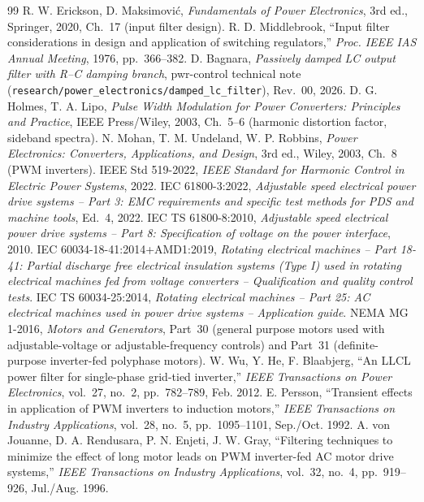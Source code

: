 \documentclass[10pt,a4paper]{scrartcl}
\begin{document}
\begin{thebibliography}{99}
 R. W. Erickson, D. Maksimovi\'c, \emph{Fundamentals of Power Electronics}, 3rd ed., Springer, 2020, Ch.~17 (input filter design).
 R. D. Middlebrook, ``Input filter considerations in design and application of switching regulators,'' \emph{Proc. IEEE IAS Annual Meeting}, 1976, pp.~366--382.
 D. Bagnara, \emph{Passively damped LC output filter with R--C damping branch}, pwr-control technical note (\texttt{research/power\_electronics/damped\_lc\_filter}), Rev.~00, 2026.
 D. G. Holmes, T. A. Lipo, \emph{Pulse Width Modulation for Power Converters: Principles and Practice}, IEEE Press/Wiley, 2003, Ch.~5--6 (harmonic distortion factor, sideband spectra).
 N. Mohan, T. M. Undeland, W. P. Robbins, \emph{Power Electronics: Converters, Applications, and Design}, 3rd ed., Wiley, 2003, Ch.~8 (PWM inverters).
 IEEE Std 519-2022, \emph{IEEE Standard for Harmonic Control in Electric Power Systems}, 2022.
 IEC 61800-3:2022, \emph{Adjustable speed electrical power drive systems -- Part 3: EMC requirements and specific test methods for PDS and machine tools}, Ed.~4, 2022.
 IEC TS 61800-8:2010, \emph{Adjustable speed electrical power drive systems -- Part 8: Specification of voltage on the power interface}, 2010.
 IEC 60034-18-41:2014+AMD1:2019, \emph{Rotating electrical machines -- Part 18-41: Partial discharge free electrical insulation systems (Type I) used in rotating electrical machines fed from voltage converters -- Qualification and quality control tests}.
 IEC TS 60034-25:2014, \emph{Rotating electrical machines -- Part 25: AC electrical machines used in power drive systems -- Application guide}.
 NEMA MG 1-2016, \emph{Motors and Generators}, Part~30 (general purpose motors used with adjustable-voltage or adjustable-frequency controls) and Part~31 (definite-purpose inverter-fed polyphase motors).
 W. Wu, Y. He, F. Blaabjerg, ``An LLCL power filter for single-phase grid-tied inverter,'' \emph{IEEE Transactions on Power Electronics}, vol.~27, no.~2, pp.~782--789, Feb. 2012.
 E. Persson, ``Transient effects in application of PWM inverters to induction motors,'' \emph{IEEE Transactions on Industry Applications}, vol.~28, no.~5, pp.~1095--1101, Sep./Oct. 1992.
 A. von Jouanne, D. A. Rendusara, P. N. Enjeti, J. W. Gray, ``Filtering techniques to minimize the effect of long motor leads on PWM inverter-fed AC motor drive systems,'' \emph{IEEE Transactions on Industry Applications}, vol.~32, no.~4, pp.~919--926, Jul./Aug. 1996.

\end{thebibliography}
\end{document}
